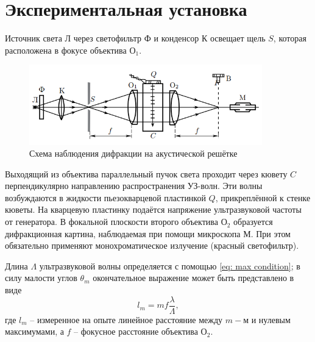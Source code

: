 \documentclass[a4paper,12pt]{article}
\begin{document}
\section{Экспериментальная установка}
Источник света $Л$ через светофильтр $Ф$ и конденсор $К$ освещает щель $S$, которая расположена в фокусе объектива $О_1$. 
\begin{figure}[H]\label{fig: Exp setup 1}
    \centering
    \includegraphics[width = 0.9\textwidth]{Exp setup 1.png}
    \caption{Схема наблюдения дифракции на акустической решётке}
\end{figure}
Выходящий из объектива параллельный пучок света проходит через кювету $C$ перпендикулярно направлению распространения УЗ-волн. Эти волны возбуждаются в жидкости пьезокварцевой пластинкой $Q$, прикреплённой к стенке кюветы. На кварцевую пластинку подаётся напряжение ультразвуковой частоты от генератора. В фокальной плоскости второго объектива $О_2$ образуется дифракционная картина, наблюдаемая при помощи микроскопа $М$. При этом обязательно применяют монохроматическое излучение (красный светофильтр).

Длина $\Lambda$ ультразвуковой волны определяется с помощью \eqref{eq: max condition}; в силу малости углов $\theta_m$ окончательное выражение может быть представлено в виде
\begin{equation}\label{eq: distance between max}
    l_m = mf\frac{\lambda}{\Lambda},
\end{equation}
где $l_m$ -- измеренное на опыте линейное расстояние между $m-$м и нулевым максимумами, а $f$ -- фокусное расстояние объектива $О_2$.
\end{document}

